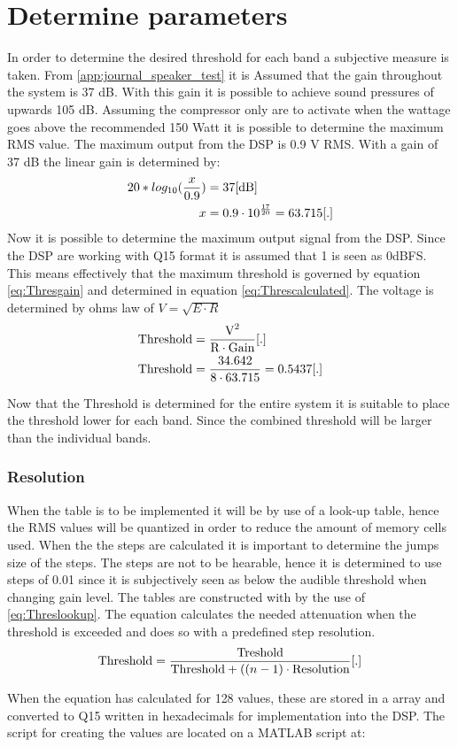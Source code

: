 \section{Determine parameters}
In order to determine the desired threshold for each band a subjective measure is taken.
From \autoref{app:journal_speaker_test} it is Assumed that the gain throughout the system is 37 dB. With this gain it is possible to achieve sound pressures of upwards 105 dB. Assuming the compressor only are to activate when the wattage goes above the recommended 150 Watt it is possible to determine the maximum RMS value. The maximum output from the DSP is 0.9 V RMS. With a gain of 37 dB the linear gain is determined by:
\vspace{-3mm}
\begin{align}
20*log_{10}(\frac{x}{0.9})&=37 \enhed{dB}
\\
x&=0.9 \cdot 10^{\frac{17}{20}} = 63.715 \enhed{.}
\end{align}
Now it is possible to determine the maximum output signal from the DSP. Since the DSP are working with Q15 format it is assumed that 1 is seen as 0dBFS. This means effectively that the maximum threshold is governed by equation \ref{eq:Thresgain} and determined in equation \ref{eq:Threscalculated}. The voltage is determined by ohms law of $V=\sqrt{E \cdot R}$
\vspace{-3mm}
\begin{align}
\text{Threshold}&=\frac{\text{V}^2}{\text{R} \cdot \text{Gain}}\enhed{.}\label{eq:Thresgain}
\\
\text{Threshold}&=\frac{34.642}{8 \cdot 63.715}=0.5437\enhed{.}\label{eq:Threscalculated}
\end{align}

Now that the Threshold is determined for the entire system it is suitable to place the threshold lower for each band. Since the combined threshold will be larger than the individual bands. 

\subsubsection*{Resolution}

When the table is to be implemented it will be by use of a look-up table, hence the RMS values will be quantized in order to reduce the amount of memory cells used. When the the steps are calculated it is important to determine the jumps size of the steps. The steps are not to be hearable, hence it is determined to use steps of 0.01 since it is subjectively seen as below the audible threshold when changing gain level. The tables are constructed with by the use of \autoref{eq:Threslookup}. The equation calculates the needed attenuation when the threshold is exceeded and does so with a predefined step resolution.
\vspace{-2mm}
\begin{equation}\label{eq:Threslookup}
\text{Threshold}=\frac{\text{Treshold}}{\text{Threshold}+((n-1) \cdot \text{Resolution}}\enhed{.}
\end{equation}

When the equation has calculated for 128 values, these are stored in a array and converted to Q15 written in hexadecimals for implementation into the DSP.
The script for creating the values are located on a MATLAB script at: \\







